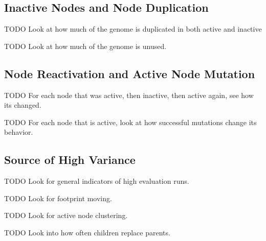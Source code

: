 \documentclass[journal]{IEEEtran}
\begin{document}
\begin{comment}
Using the algorithm given in Figure~\ref{fig:simplify}, we can determine the
absolute minimum set of nodes in a genome's solution that are necessary to
reproduce the original output of that genome.  This allows us to discuss
the usefulness of each node as either being part of the minimum solution, a
duplicate of a node in the minimum solution, or irrelevant to the solution.
As such we can then examine how redundancy is being used, how frequently useful
structures exist in the inactive nodes, and how useful nodes are constructed by evolution.
This algorithm can also be used to construct simplified genomes when combined
with the algorithm given in Figure~\ref{fig:reorder}.
\end{comment}
\subsection{Inactive Nodes and Node Duplication}
TODO Look at how much of the genome is duplicated in both active and inactive

TODO Look at how much of the genome is unused.

\subsection{Node Reactivation and Active Node Mutation}
TODO For each node that was active, then inactive, then active again, see how its changed.

TODO For each node that is active, look at how successful mutations change its behavior.

\subsection{Source of High Variance}
TODO Look for general indicators of high evaluation runs.

TODO Look for footprint moving.

TODO Look for active node clustering.

TODO Look into how often children replace parents.


%
%
\end{document}
